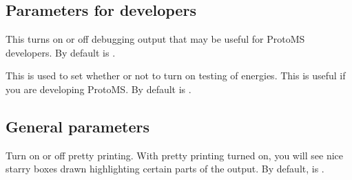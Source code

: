 \documentclass[letterpaper,10pt,english]{sphinxmanual}
\begin{document}
\subsection{Parameters for developers}
\label{\detokenize{protoms:parameters-for-developers}}
\ignorespaces 
\def\sphinxLiteralBlockLabel{\label{\detokenize{protoms:index-28}}}
%
\begin{sphinxVerbatim}[commandchars=\\\{\}]
 
\end{sphinxVerbatim}

This turns on or off debugging output that may be useful for ProtoMS developers. By default  is .

\ignorespaces 
\def\sphinxLiteralBlockLabel{\label{\detokenize{protoms:index-29}}}
%
\begin{sphinxVerbatim}[commandchars=\\\{\}]
 
\end{sphinxVerbatim}

This is used to set whether or not to turn on testing of energies. This is useful if you are developing ProtoMS. By default  is .


\subsection{General parameters}
\label{\detokenize{protoms:general-parameters}}
\ignorespaces 
\def\sphinxLiteralBlockLabel{\label{\detokenize{protoms:index-30}}}
%
\begin{sphinxVerbatim}[commandchars=\\\{\}]
 
\end{sphinxVerbatim}

Turn on or off pretty printing. With pretty printing turned on, you will see nice starry boxes drawn highlighting certain parts of the output. By default,  is .

\ignorespaces 
\def\sphinxLiteralBlockLabel{\label{\detokenize{protoms:index-31}}}
%
\begin{sphinxVerbatim}[commandchars=\\\{\}]
 
\end{sphinxVerbatim}
\end{document}
